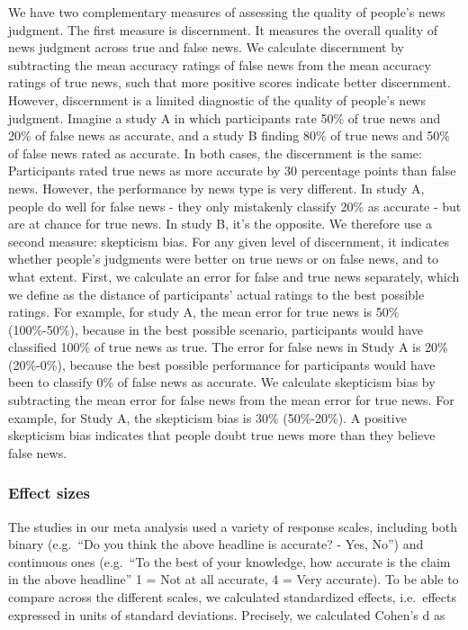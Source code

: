 \documentclass[
  doc,floatsintext]{apa6}
\begin{document}
We have two complementary measures of assessing the quality of people's news judgment. The first measure is discernment. It measures the overall quality of news judgment across true and false news. We calculate discernment by subtracting the mean accuracy ratings of false news from the mean accuracy ratings of true news, such that more positive scores indicate better discernment. However, discernment is a limited diagnostic of the quality of people's news judgment. Imagine a study A in which participants rate 50\% of true news and 20\% of false news as accurate, and a study B finding 80\% of true news and 50\% of false news rated as accurate. In both cases, the discernment is the same: Participants rated true news as more accurate by 30 percentage points than false news. However, the performance by news type is very different. In study A, people do well for false news - they only mistakenly classify 20\% as accurate - but are at chance for true news. In study B, it's the opposite. We therefore use a second measure: skepticism bias. For any given level of discernment, it indicates whether people's judgments were better on true news or on false news, and to what extent. First, we calculate an error for false and true news separately, which we define as the distance of participants' actual ratings to the best possible ratings. For example, for study A, the mean error for true news is 50\% (100\%-50\%), because in the best possible scenario, participants would have classified 100\% of true news as true. The error for false news in Study A is 20\% (20\%-0\%), because the best possible performance for participants would have been to classify 0\% of false news as accurate. We calculate skepticism bias by subtracting the mean error for false news from the mean error for true news. For example, for Study A, the skepticism bias is 30\% (50\%-20\%). A positive skepticism bias indicates that people doubt true news more than they believe false news.

\subsubsection{Effect sizes}\label{effect-sizes}

The studies in our meta analysis used a variety of response scales, including both binary (e.g.~``Do you think the above headline is accurate? - Yes, No'') and continuous ones (e.g.~``To the best of your knowledge, how accurate is the claim in the above headline'' 1 = Not at all accurate, 4 = Very accurate). To be able to compare across the different scales, we calculated standardized effects, i.e.~effects expressed in units of standard deviations. Precisely, we calculated Cohen's d as
\end{document}
